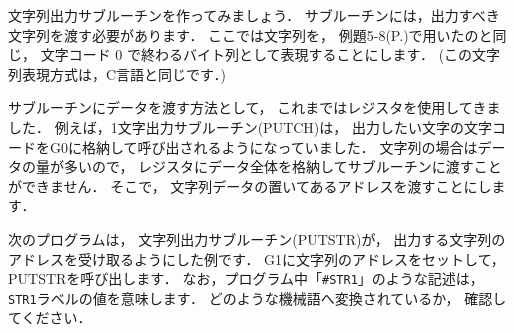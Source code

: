 文字列出力サブルーチンを作ってみましょう．
サブルーチンには，出力すべき文字列を渡す必要があります．
ここでは文字列を，
例題5-8(P.\pageref{rei:5_8})で用いたのと同じ，
文字コード 0 で終わるバイト列として表現することにします．
(この文字列表現方式は，C言語と同じです．)


サブルーチンにデータを渡す方法として，
これまではレジスタを使用してきました．
例えば，1文字出力サブルーチン(PUTCH)は，
出力したい文字の文字コードをG0に格納して呼び出されるようになっていました．
文字列の場合はデータの量が多いので，
レジスタにデータ全体を格納してサブルーチンに渡すことができません．
そこで，
文字列データの置いてあるアドレスを渡すことにします．

次のプログラムは，
文字列出力サブルーチン(PUTSTR)が，
出力する文字列のアドレスを受け取るようにした例です．
G1に文字列のアドレスをセットして，PUTSTRを呼び出します．
なお，プログラム中「{\tt \#STR1}」のような記述は，
{\tt STR1}ラベルの値を意味します．
どのような機械語へ変換されているか，
確認してください．

